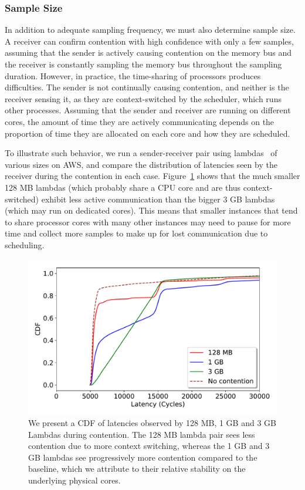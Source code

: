 \subsubsection{Sample Size} 
\label{sec:method:samplingdur}
In addition to adequate sampling frequency, we must also determine sample size.  
A receiver can confirm contention with high confidence with only a
few samples, assuming that the sender is actively causing contention on the
memory bus and the receiver is constantly sampling the memory bus throughout the
sampling duration. However, in practice, the time-sharing of processors
produces difficulties. The sender is not continually causing contention, and
neither is the receiver sensing it, as they are context-switched by the
scheduler, which runs other processes. Assuming that the sender and receiver are
running on different cores, the amount of time they are actively communicating
depends on the proportion of time they are allocated on each core and how they
are scheduled. 

To illustrate such behavior, we run a sender-receiver pair using
lambdas~\cite{awslambda} of various sizes on AWS, and compare the distribution
of latencies seen by the receiver during the contention in each case.
Figure~\ref{fig:context_switching} shows that the much smaller 128 MB lambdas
(which probably share a CPU core and are thus context-switched) exhibit less
active communication than the bigger 3 GB lambdas (which may run on dedicated
cores). This means that smaller instances that tend to share processor cores
with many other instances may need to pause for more time and collect more
samples to make up for lost communication due to scheduling.


\begin{figure}[!t]
  \includegraphics[width=.99\linewidth]{fig/lambda_sched_effect.pdf}
  \caption{We present a CDF of latencies observed by 128 MB, 1 GB and 3 GB
  Lambdas during contention. The 128 MB lambda pair sees less contention due to
  more context switching, whereas the 1 GB and 3 GB lambdas see progressively
  more contention compared to the baseline, which we attribute to their relative
  stability on the underlying physical cores. 
\label{fig:context_switching}}
\end{figure}

